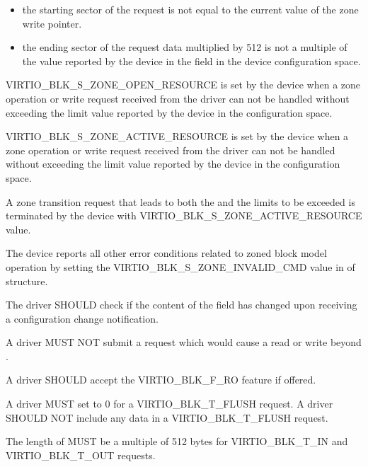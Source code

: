 \begin{itemize}
\item the starting sector of the request is not equal to the current value of
    the zone write pointer.

\item the ending sector of the request data multiplied by 512 is not a multiple
    of the value reported by the device in the field 
    in the device configuration space.
\end{itemize}

VIRTIO_BLK_S_ZONE_OPEN_RESOURCE is set by the device when a zone operation or
write request received from the driver can not be handled without exceeding the
 limit value reported by the device in the configuration
space.

VIRTIO_BLK_S_ZONE_ACTIVE_RESOURCE is set by the device when a zone operation or
write request received from the driver can not be handled without exceeding the
 limit value reported by the device in the configuration
space.

A zone transition request that leads to both the  and the
 limits to be exceeded is terminated by the device with
VIRTIO_BLK_S_ZONE_ACTIVE_RESOURCE  value.

The device reports all other error conditions related to zoned block model
operation by setting the VIRTIO_BLK_S_ZONE_INVALID_CMD value in
 of  structure.


The driver SHOULD check if the content of the  field has
changed upon receiving a configuration change notification.

A driver MUST NOT submit a request which would cause a read or write
beyond .

A driver SHOULD accept the VIRTIO_BLK_F_RO feature if offered.

A driver MUST set  to 0 for a VIRTIO_BLK_T_FLUSH request.
A driver SHOULD NOT include any data in a VIRTIO_BLK_T_FLUSH request.

The length of  MUST be a multiple of 512 bytes for VIRTIO_BLK_T_IN
and VIRTIO_BLK_T_OUT requests.

